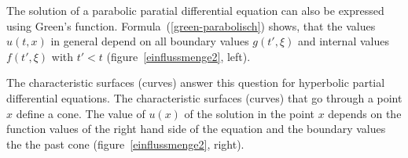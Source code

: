 The solution of a parabolic paratial differential equation can also be
expressed using Green's function.
Formula~(\ref{green-parabolisch}) shows, that the values $u(t,x)$
in general depend on all boundary values
$g(t',\xi)$ and internal values $f(t',\xi)$
with $t'<t$ (figure~\ref{einflussmenge2}, left).

The characteristic surfaces (curves) answer this question for hyperbolic
partial differential equations.
The characteristic surfaces (curves) that go through a point $x$
define a cone.
The value of $u(x)$ of the solution in the point $x$ depends on the
function values of the right hand side of the equation and the boundary values
the the past cone
(figure~\ref{einflussmenge2}, right).

